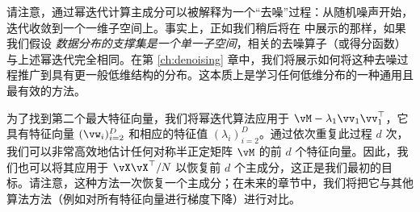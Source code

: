 \documentclass[../../book-main_zh.tex]{subfiles}
\begin{document}
\begin{remark}[作为去噪过程的幂迭代]
    请注意，通过幂迭代计算主成分可以被解释为一个“去噪”过程：从随机噪声开始，迭代收敛到一个一维子空间上。事实上，正如我们稍后将在
     中展示的那样，如果我们假设{\em
    数据分布的支撑集是一个单一子空间}，相关的去噪算子（或得分函数）与上述幂迭代完全相同。在第 \ref{ch:denoising}
    章中，我们将展示如何将这种去噪过程推广到具有更一般低维结构的分布。这本质上是学习任何低维分布的一种通用且最有效的方法。
\end{remark}

为了找到第二个最大特征向量，我们将幂迭代算法应用于 \(\vM -
\lambda_{1}\vv_{1}\vv_{1}^{\top}\)，它具有特征向量 \((\vw_{i})_{i = 2}^{D}\)
和相应的特征值 \((\lambda_{i})_{i = 2}^{D}\)。通过依次重复此过程 \(d\)
次，我们可以非常高效地估计任何对称半正定矩阵 \(\vM\) 的前 \(d\) 个特征向量。因此，我们也可以将其应用于
\(\vX\vX^{\top}/N\) 以恢复前 \(d\)
个主成分，这正是我们最初的目标。请注意，这种方法一次恢复一个主成分；在未来的章节中，我们将把它与其他算法方法（例如对所有特征向量进行梯度下降）进行对比。

%
\end{document}

